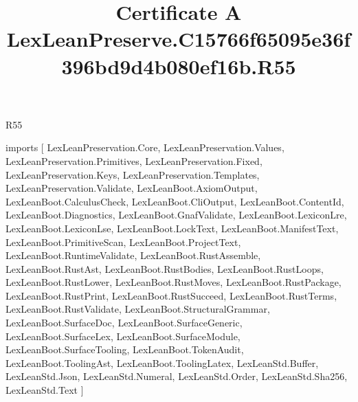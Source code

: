 \begin{lexlean}{R55}
\title{Certificate A LexLeanPreserve.C15766f65095e36f396bd9d4b080ef16b.R55}
\begin{coremodule}
imports [
  LexLeanPreservation.Core,
  LexLeanPreservation.Values,
  LexLeanPreservation.Primitives,
  LexLeanPreservation.Fixed,
  LexLeanPreservation.Keys,
  LexLeanPreservation.Templates,
  LexLeanPreservation.Validate,
  LexLeanBoot.AxiomOutput,
  LexLeanBoot.CalculusCheck,
  LexLeanBoot.CliOutput,
  LexLeanBoot.ContentId,
  LexLeanBoot.Diagnostics,
  LexLeanBoot.GnafValidate,
  LexLeanBoot.LexiconLre,
  LexLeanBoot.LexiconLse,
  LexLeanBoot.LockText,
  LexLeanBoot.ManifestText,
  LexLeanBoot.PrimitiveScan,
  LexLeanBoot.ProjectText,
  LexLeanBoot.RuntimeValidate,
  LexLeanBoot.RustAssemble,
  LexLeanBoot.RustAst,
  LexLeanBoot.RustBodies,
  LexLeanBoot.RustLoops,
  LexLeanBoot.RustLower,
  LexLeanBoot.RustMoves,
  LexLeanBoot.RustPackage,
  LexLeanBoot.RustPrint,
  LexLeanBoot.RustSucceed,
  LexLeanBoot.RustTerms,
  LexLeanBoot.RustValidate,
  LexLeanBoot.StructuralGrammar,
  LexLeanBoot.SurfaceDoc,
  LexLeanBoot.SurfaceGeneric,
  LexLeanBoot.SurfaceLex,
  LexLeanBoot.SurfaceModule,
  LexLeanBoot.SurfaceTooling,
  LexLeanBoot.TokenAudit,
  LexLeanBoot.ToolingAst,
  LexLeanBoot.ToolingLatex,
  LexLeanStd.Buffer,
  LexLeanStd.Json,
  LexLeanStd.Numeral,
  LexLeanStd.Order,
  LexLeanStd.Sha256,
  LexLeanStd.Text
]


\end{coremodule}
\end{lexlean}
